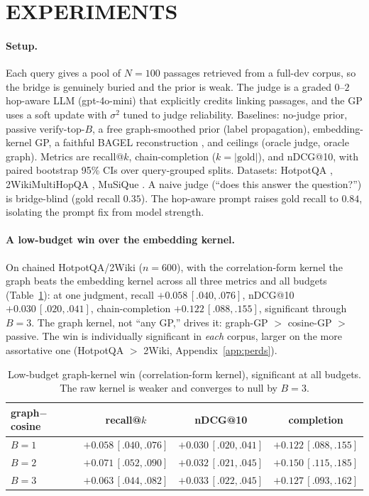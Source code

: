 \documentclass[twoside]{article}
\theoremstyle{plain}
\theoremstyle{definition}
\begin{document}
\section{EXPERIMENTS}\label{sec:exp}
\paragraph{Setup.} Each query gives a pool of $N=100$ passages retrieved from a full-dev corpus, so the bridge is
genuinely buried and the prior is weak. The judge is a graded $0$--$2$ hop-aware LLM (gpt-4o-mini) that explicitly
credits linking passages, and the GP uses a soft update with $\sigma^2$ tuned to judge reliability. Baselines:
no-judge prior, passive verify-top-$B$, a free graph-smoothed prior (label propagation), embedding-kernel GP, a
faithful BAGEL reconstruction \citep{bagel2026}, and ceilings (oracle judge, oracle graph). Metrics are recall@$k$,
chain-completion ($k=|\text{gold}|$), and nDCG@10, with paired bootstrap 95\% CIs over query-grouped splits.
Datasets: HotpotQA \citep{yang2018hotpotqa}, 2WikiMultiHopQA \citep{ho2020twowiki}, MuSiQue
\citep{trivedi2022musique}. A naive judge (``does this answer the question?'') is bridge-blind (gold recall
$0.35$). The hop-aware prompt raises gold recall to $0.84$, isolating the prompt fix from model strength.

\paragraph{A low-budget win over the embedding kernel.} On chained HotpotQA/2Wiki ($n{=}600$), with the
correlation-form kernel the graph beats the embedding kernel across all three metrics and all budgets
(Table~\ref{tab:main}): at one judgment, recall $+0.058\,[.040,.076]$, nDCG@10 $+0.030\,[.020,.041]$,
chain-completion $+0.122\,[.088,.155]$, significant through $B{=}3$. The graph kernel, not ``any GP,'' drives it:
graph-GP $>$ cosine-GP $>$ passive. The win is individually significant in \emph{each} corpus, larger on the more
assortative one (HotpotQA $>$ 2Wiki, Appendix~\ref{app:perds}).
\begin{table}[t]\caption{Low-budget graph-kernel win (correlation-form kernel), significant at all budgets. The
raw kernel is weaker and converges to null by $B=3$.}\label{tab:main}
\begin{center}\small
\begin{tabular}{lccc}
\toprule
graph$-$cosine & recall@$k$ & nDCG@10 & completion \\ \midrule
$B=1$ & $+0.058\,[.040,.076]$ & $+0.030\,[.020,.041]$ & $+0.122\,[.088,.155]$ \\
$B=2$ & $+0.071\,[.052,.090]$ & $+0.032\,[.021,.045]$ & $+0.150\,[.115,.185]$ \\
$B=3$ & $+0.063\,[.044,.082]$ & $+0.033\,[.022,.045]$ & $+0.127\,[.093,.162]$ \\
\bottomrule
\end{tabular}
\end{center}
\end{table}
\end{document}
